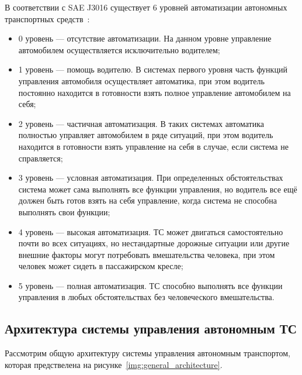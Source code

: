 В соответствии с SAE J3016 существует 6 уровней автоматизации автономных транспортных средств~\cite{Steckhan2022}:

\begin{itemize}

	\item 	0 уровень --- отсутствие автоматизации. На данном уровне управление автомобилем осуществляется исключительно водителем;

	\item 	1 уровень --- помощь водителю. В системах первого уровня часть функций управления автомобиля осуществляет автоматика, при этом водитель постоянно находится в готовности взять полное управление автомобилем на себя;
	
	\item	2 уровень --- частичная автоматизация. В таких системах автоматика полностью управляет автомобилем в ряде ситуаций, при этом водитель находится в готовности взять управление на себя в случае, если система не справляется;
	
	\item	3 уровень --- условная автоматизация. При определенных обстоятельствах система может сама выполнять все функции управления, но водитель все ещё должен быть готов взять на себя управление, когда система не способна выполнять свои функции;
	
	\item 	4 уровень --- высокая автоматизация. ТС может двигаться самостоятельно почти во всех ситуациях, но нестандартные дорожные ситуации или другие внешние факторы могут потребовать вмешательства человека, при этом человек может сидеть в пассажирском кресле;
	
	\item 	5 уровень --- полная автоматизация. ТС способно выполнять все функции управления в любых обстоятельствах без человеческого вмешательства.

\end{itemize}

\subsection{Архитектура системы управления автономным ТС}

Рассмотрим общую архитектуру системы управления автономным транспортом, которая предствелена на рисунке~\ref{img:general_architecture}.


